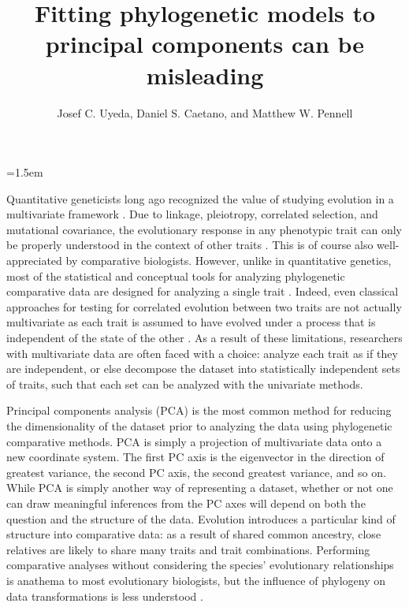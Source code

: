 \documentclass[a4paper,11pt]{article}
\title{Fitting phylogenetic models to principal components can be misleading}
\author{
Josef C. Uyeda, Daniel S. Caetano, and Matthew W. Pennell
}
\date{}
\affiliation{
Department of Biological Sciences \& Institute for Bioinformatics and Evolutionary Studies, University of Idaho, Moscow, ID 83844, U.S.A. 
}
\begin{document}
\mstitlepage
\parindent=1.5em
\addtolength{\parskip}{.3em}
\vfill
 
\finaltrue
\newpage
\singlespacing

\noindent Quantitative geneticists long ago recognized the value of studying evolution in a multivariate framework \citep{Pearson1903}. Due to linkage, pleiotropy, correlated selection, and mutational covariance, the evolutionary response in any phenotypic trait can only be properly understood in the context of other traits \citep{Lande1979, LynchWalsh}. This is of course also well-appreciated by comparative biologists. However, unlike in quantitative genetics, most of the statistical and conceptual tools for analyzing phylogenetic comparative data \citep[reviewed in][]{PennellHarmon} are designed for analyzing a single trait \citep[but see,][for exceptions]{RevellHarmon2008, RevellPCCA, Hohenlohe2008, RevellCollar2009, Schmitz2011, Bartoszek2012, Adams2014b,Adams2014}. Indeed, even classical approaches for testing for correlated evolution between two traits \citep[e.g.,][]{Felsenstein1985, Grafen1989, HarveyPagel1991} are not actually multivariate as each trait is assumed to have evolved under a process that is independent of the state of the other \citep{HansenOrzack2005}. As a result of these limitations, researchers with multivariate data are often faced with a choice: analyze each trait as if they are independent, or else decompose the dataset into statistically independent sets of traits, such that each set can be analyzed with the univariate methods.

Principal components analysis (PCA) is the most common method for reducing the dimensionality of the dataset prior to analyzing the data using phylogenetic comparative methods. PCA is simply a projection of multivariate data onto a new coordinate system. The first PC axis is the eigenvector in the direction of greatest variance, the second PC axis, the second greatest variance, and so on. While PCA is simply another way of representing a dataset, whether or not one can draw meaningful inferences from the PC axes will depend on both the question and the structure of the data. Evolution introduces a particular kind of structure into comparative data: as a result of shared common ancestry, close relatives are likely to share many traits and trait combinations. Performing comparative analyses without considering the species' evolutionary relationships is anathema to most evolutionary biologists, but the influence of phylogeny on data transformations is less understood \citep{Revell2008, Polly2013}.
\end{document}
